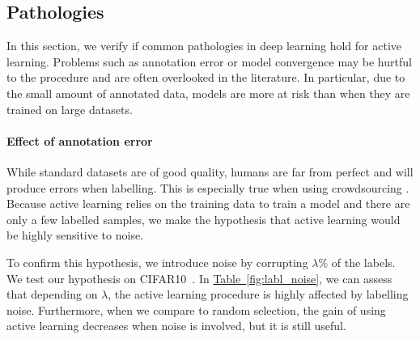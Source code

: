 \documentclass{article}
\newcommand{\toref}[1]{{\color{red}REF #1 }}
\newcommand{\tabref}[1]{\hyperref[#1]{Table\ \ref*{#1}}}
\begin{document}

\subsection{Pathologies}\label{pathologies}
In this section, we verify if common pathologies in deep learning hold for active learning. Problems such as annotation error or  model convergence %
may be hurtful to the procedure and are often overlooked in the literature. In particular, due to the small amount of annotated data, models are more at risk than when they are trained on large datasets.


\paragraph{Effect of annotation error}
While standard datasets are of good quality, humans are far from perfect and will produce errors when labelling. This is especially true when using crowdsourcing \citep{allahbakhsh2013quality}.
Because active learning relies on the training data to train a model and there are only a few labelled samples, we make the hypothesis that active learning would be highly sensitive to noise.

To confirm this hypothesis, we introduce noise by corrupting $\lambda \%$ of the labels. We test our hypothesis on CIFAR10~\citep{krizhevsky2009learning}. In \tabref{fig:labl_noise}, we can assess that depending on $\lambda$, the active learning procedure is highly affected by labelling noise. Furthermore, when we compare to random selection, the gain of using active learning decreases when noise is involved, but it is still useful.%
\end{document}
